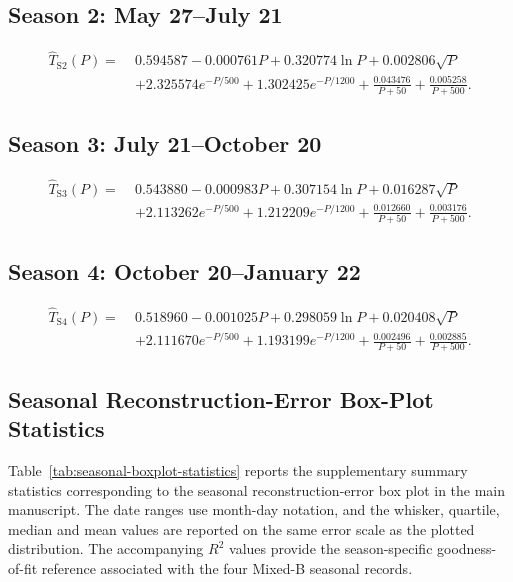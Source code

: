 \documentclass[10pt]{article}
\begin{document}
\subsection{Season 2: May 27--July 21}

\begin{equation}
\begin{aligned}
\hat{T}_{\mathrm{S2}}(P) =\;& 0.594587 - 0.000761 P + 0.320774 \ln P + 0.002806 \sqrt{P} \\
& + 2.325574 e^{-P/500} + 1.302425 e^{-P/1200}
  + \frac{0.043476}{P+50} + \frac{0.005258}{P+500}.
\end{aligned}
\end{equation}

\subsection{Season 3: July 21--October 20}

\begin{equation}
\begin{aligned}
\hat{T}_{\mathrm{S3}}(P) =\;& 0.543880 - 0.000983 P + 0.307154 \ln P + 0.016287 \sqrt{P} \\
& + 2.113262 e^{-P/500} + 1.212209 e^{-P/1200}
  + \frac{0.012660}{P+50} + \frac{0.003176}{P+500}.
\end{aligned}
\end{equation}

\subsection{Season 4: October 20--January 22}

\begin{equation}
\begin{aligned}
\hat{T}_{\mathrm{S4}}(P) =\;& 0.518960 - 0.001025 P + 0.298059 \ln P + 0.020408 \sqrt{P} \\
& + 2.111670 e^{-P/500} + 1.193199 e^{-P/1200}
  + \frac{0.002496}{P+50} + \frac{0.002885}{P+500}.
\end{aligned}
\end{equation}

\subsection{Seasonal Reconstruction-Error Box-Plot Statistics}
\label{subsec:seasonal-boxplot-statistics}

\noindent
Table~\ref{tab:seasonal-boxplot-statistics} reports the supplementary summary statistics corresponding to the seasonal reconstruction-error box plot in the main manuscript.
The date ranges use month-day notation, and the whisker, quartile, median and mean values are reported on the same error scale as the plotted distribution.
The accompanying $R^2$ values provide the season-specific goodness-of-fit reference associated with the four Mixed-B seasonal records.
\end{document}
